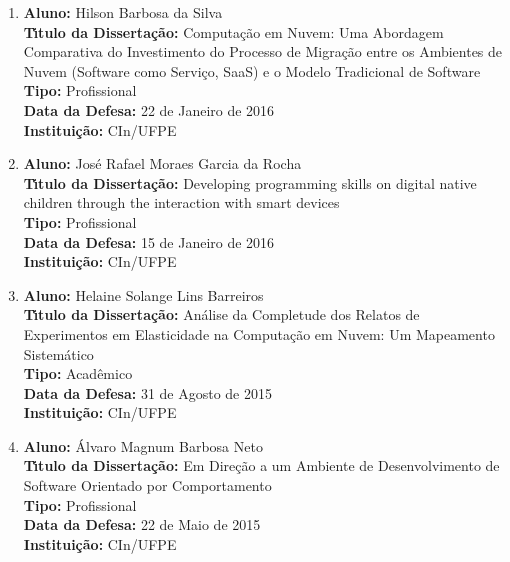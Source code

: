 \documentclass[a4paper,oneside,10pt]{article}
\begin{document}
\begin{enumerate}
\item       \textbf{Aluno:} Hilson Barbosa da Silva \mbox{} \\
            \textbf{T\'{\i}tulo da Disserta\c{c}\~{a}o:} Computação em Nuvem: Uma Abordagem Comparativa do Investimento do Processo de Migração entre os Ambientes de Nuvem (Software como Serviço, SaaS) e o Modelo Tradicional de Software\\
            \textbf{Tipo:} Profissional\\
            \textbf{Data da Defesa:} 22 de Janeiro de 2016\\
            \textbf{Institui\c{c}\~{a}o:} CIn/UFPE

\item       \textbf{Aluno:} José Rafael Moraes Garcia da Rocha \mbox{} \\
            \textbf{T\'{\i}tulo da Disserta\c{c}\~{a}o:} Developing programming skills on digital native children through the interaction with smart devices\\
            \textbf{Tipo:} Profissional\\
            \textbf{Data da Defesa:} 15 de Janeiro de 2016\\
            \textbf{Institui\c{c}\~{a}o:} CIn/UFPE

\item       \textbf{Aluno:} Helaine Solange Lins Barreiros \mbox{} \\
            \textbf{T\'{\i}tulo da Disserta\c{c}\~{a}o:} Análise da Completude dos Relatos de Experimentos em Elasticidade na Computação em Nuvem: Um Mapeamento Sistemático\\
            \textbf{Tipo:} Acadêmico\\
            \textbf{Data da Defesa:} 31 de Agosto de 2015\\
            \textbf{Institui\c{c}\~{a}o:} CIn/UFPE

\item       \textbf{Aluno:} Álvaro Magnum Barbosa Neto \mbox{} \\
            \textbf{T\'{\i}tulo da Disserta\c{c}\~{a}o:} Em Direção a um Ambiente de Desenvolvimento de Software Orientado por Comportamento\\
            \textbf{Tipo:} Profissional\\
            \textbf{Data da Defesa:} 22 de Maio de 2015\\
            \textbf{Institui\c{c}\~{a}o:} CIn/UFPE


\end{enumerate}
\end{document}
